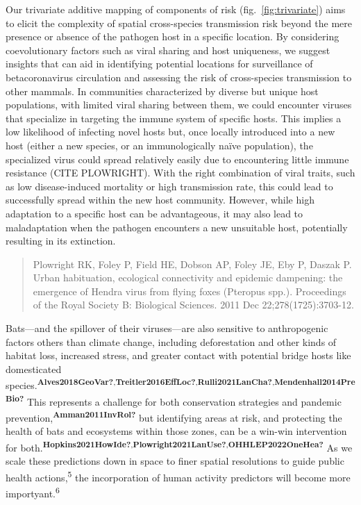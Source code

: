 \documentclass[10pt,oneside]{article}
\begin{document}
Our trivariate additive mapping of components of risk
(fig.~\ref{fig:trivariate}) aims to elicit the complexity of spatial
cross-species transmission risk beyond the mere presence or absence of
the pathogen host in a specific location. By considering coevolutionary
factors such as viral sharing and host uniqueness, we suggest insights
that can aid in identifying potential locations for surveillance of
betacoronavirus circulation and assessing the risk of cross-species
transmission to other mammals. In communities characterized by diverse
but unique host populations, with limited viral sharing between them, we
could encounter viruses that specialize in targeting the immune system
of specific hosts. This implies a low likelihood of infecting novel
hosts but, once locally introduced into a new host (either a new
species, or an immunologically naïve population), the specialized virus
could spread relatively easily due to encountering little immune
resistance (CITE PLOWRIGHT). With the right combination of viral traits,
such as low disease-induced mortality or high transmission rate, this
could lead to successfully spread within the new host community.
However, while high adaptation to a specific host can be advantageous,
it may also lead to maladaptation when the pathogen encounters a new
unsuitable host, potentially resulting in its extinction.

\begin{quote}
Plowright RK, Foley P, Field HE, Dobson AP, Foley JE, Eby P, Daszak P.
Urban habituation, ecological connectivity and epidemic dampening: the
emergence of Hendra virus from flying foxes (Pteropus spp.). Proceedings
of the Royal Society B: Biological Sciences. 2011 Dec
22;278(1725):3703-12.
\end{quote}

Bats---and the spillover of their viruses---are also sensitive to
anthropogenic factors others than climate change, including
deforestation and other kinds of habitat loss, increased stress, and
greater contact with potential bridge hosts like domesticated
species.\textsuperscript{\textbf{Alves2018GeoVar?},\textbf{Treitler2016EffLoc?},\textbf{Rulli2021LanCha?},\textbf{Mendenhall2014PreBio?}}
This represents a challenge for both conservation strategies and
pandemic prevention,\textsuperscript{\textbf{Amman2011InvRol?}} but
identifying areas at risk, and protecting the health of bats and
ecosystems within those zones, can be a win-win intervention for
both.\textsuperscript{\textbf{Hopkins2021HowIde?},\textbf{Plowright2021LanUse?},\textbf{OHHLEP2022OneHea?}}
As we scale these predictions down in space to finer spatial resolutions
to guide public health actions,\textsuperscript{5} the incorporation of
human activity predictors will become more
importyant.\textsuperscript{6}
\end{document}
